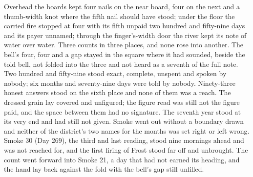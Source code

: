 Overhead the boards kept four nails on the near board, four on the next and a thumb-width knot where the fifth nail should have stood; under the floor the carried fire stopped at four with its fifth unpaid two hundred and fifty-nine days and its payer unnamed; through the finger's-width door the river kept its note of water over water. Three counts in three places, and none rose into another. The bell's four, four and a gap stayed in the square where it had sounded, beside the told bell, not folded into the three and not heard as a seventh of the full note. Two hundred and fifty-nine stood exact, complete, unspent and spoken by nobody; six months and seventy-nine days were told by nobody. Ninety-three honest answers stood on the sixth place and none of them was a reach. The dressed grain lay covered and unfigured; the figure read was still not the figure paid, and the space between them had no signature. The seventh year stood at its very end and had still not given. Smoke went out without a boundary drawn and neither of the district's two names for the months was set right or left wrong. Smoke 30 (Day 269), the third and last reading, stood nine mornings ahead and was not reached for, and the first firing of Frost stood far off and unbrought. The count went forward into Smoke 21, a day that had not earned its heading, and the hand lay back against the fold with the bell's gap still unfilled.

